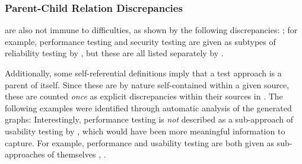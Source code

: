 \ifnotpaper\else\fi

\begin{enumerate}
    
\end{enumerate}

\subsubsection{Parent-Child Relation Discrepancies}
\label{pars}

 are also not immune to difficulties\ifnotpaper, as shown
by the following discrepancies:
 \else; for example, performance \fi testing and
security testing are given as subtypes of reliability testing by
\citep{ISO_IEC2023a}, but these are all listed separately by
\citep[p.~53]{Firesmith2015}.

\label{selfPars}
Additionally, some self-referential definitions imply that a test
approach is a parent of itself. Since these are by nature self-contained within
a given source, these are counted \emph{once} as explicit discrepancies within
their sources in . \ifnotpaper The following
    examples were identified through automatic analysis of the generated graphs:
     Interestingly, performance testing is \emph{not}
    described as a sub-approach of usability testing by \citep{Gerrard2000a,
        Gerrard2000b}, which would have been more meaningful information to
    capture. \else For example, performance and usability testing are both
    given as sub-approaches of themselves \cite[Tab.~2]{Gerrard2000a},
    \cite[Tab.~1]{Gerrard2000b}.\fi

